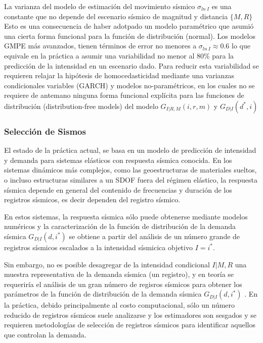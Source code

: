 \documentclass[
]{krantz}
\begin{document}
La varianza del modelo de estimación del movimiento sísmico \(\sigma_{ln \ I}\) es una constante que no depende del escenario sísmico de magnitud y distancia \(\{M,R\}\) Esto es una consecuencia de haber adotpado un modelo paramétrico que asumió una cierta forma funcional para la función de distribución (normal). Los modelos GMPE más avanzados, tienen términos de error no menores a \(\sigma_{ln \ I}\approx0.6\) lo que equivale en la práctica a asumir una variabilidad no menor al 80\% para la predicción de la intensidad en un escenario dado. Para reducir esta variabilidad se requieren relajar la hipótesis de homocedasticidad mediante una varianzas condicionales variables (GARCH) y modelos no-paramétricos, en los cuales no se requiere de antemano ninguna forma funcional explícita para las funciones de distribución (distribution-free models) del modelo \(G_{I|R,M}(i,r,m)\) y \(G_{D|I}(d^*,i)\)

\hypertarget{selecciuxf3n-de-sismos}{%
\subsubsection*{Selección de Sismos}\label{selecciuxf3n-de-sismos}}

El estado de la práctica actual, se basa en un modelo de predicción de intensidad y demanda para sistemas elásticos con respuesta sísmica conocida. En los sistemas dinámicos más complejos, como las geoestructuras de materiales sueltos, o incluso estructuras similares a un SDOF fuera del régimen elástico, la respuesta sísmica depende en general del contenido de frecuencias y duración de los registros sísmicos, es decir dependen del registro sísmico.

En estos sistemas, la respuesta sísmica sólo puede obtenerse mediante modelos numéricos y la caracterización de la función de distribución de la demanda sísmica \(G_{D|I}(d,i^*)\) se obtiene a partir del análisis de un número grande de registros sísmicos escalados a la intensidad sísmicica objetivo \(I=i^*\).

Sin embargo, no es posible desagregar de la intensidad condicional \(I|M,R\) una muestra representativa de la demanda sísmica (un registro), y en teoría se requeriría el análisis de un gran número de regisros sísmicos para obtener los parámetros de la función de distribución de la demanda sísmica \(G_{D|I}(d,i^*)\) . En la práctica, debido principalmente al costo computacional, sólo un número reducido de registros sísmicos suele analizarse y los estimadores son sesgados y se requieren metodologías de selección de registros sísmicos para identificar aquellos que controlan la demanda.
\end{document}
